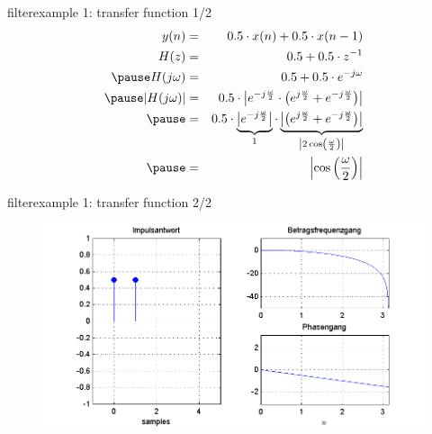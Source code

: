 	\begin{frame}{filter}{example 1: transfer function 1/2}
    	\begin{eqnarray}
	        		y(n) &=& 0.5\cdot x(n) + 0.5\cdot x(n-1)\\
	        		H(z) &=& 0.5  + 0.5\cdot z^{-1}\\
	       	\pause
	        		H(j\omega) &=& 0.5  + 0.5\cdot e^{-j\omega}\\
	       	\pause
	       			|H(j\omega)| &=&0.5 \cdot \left| e^{-j\frac{\omega}{2}} \cdot \left( e^{j\frac{\omega}{2}} + e^{-j\frac{\omega}{2}}\right)\right| \\
	       	\pause
	       				&=&0.5 \cdot \underbrace{\left| e^{-j\frac{\omega}{2}}\right|}_{1} \cdot  \underbrace{\left|\left( e^{j\frac{\omega}{2}} + e^{-j\frac{\omega}{2}}\right)\right|}_{\left| 2\cos\left(\frac{\omega}{2}\right) \right|} \\
	       	\pause
	       	&=& \left| \cos\left(\frac{\omega}{2}\right) \right|
    	\end{eqnarray}
	\end{frame}	
	
	\begin{frame}{filter}{example 1: transfer function 2/2}
		\begin{figure}
			\centerline{\includegraphics[scale=.5]{graph/fx_01}}
		    \label{fig:fx_01}
		\end{figure}
	\end{frame}	
	
